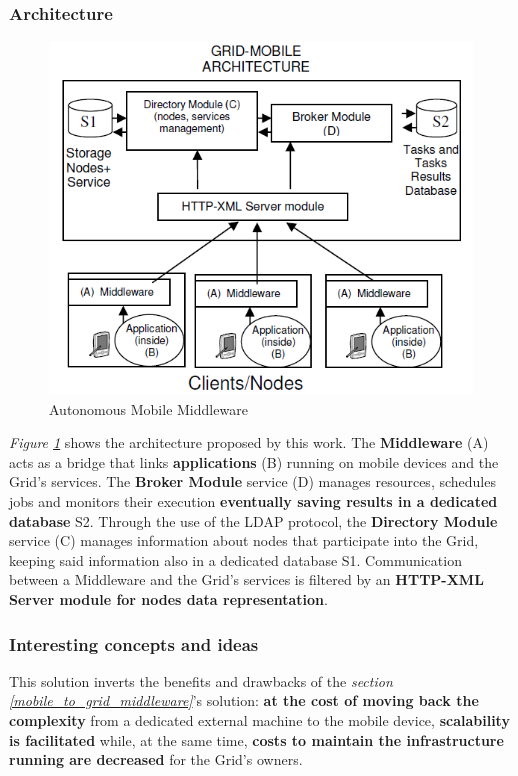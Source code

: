\subsubsection{Architecture}
\begin{figure}[!ht]
    \centering
    \includegraphics[scale=0.9]{document/chapters/chapter_3/images/2006_architecture.png}
    \caption{Autonomous Mobile Middleware \cite{towards_a_middleware_for_mobile_grids}}
    \label{fig:2006_architecture}
\end{figure}

\textit{Figure \ref{fig:2006_architecture}} shows the architecture proposed by this work. The \textbf{Middleware} (A) acts as a bridge that links \textbf{applications} (B) running on mobile devices and the Grid's services. The \textbf{Broker Module} service (D) manages resources, schedules jobs and monitors their execution \textbf{eventually saving results in a dedicated database} S2. Through the use of the LDAP protocol, the \textbf{Directory Module} service (C) manages information about nodes that participate into the Grid, keeping said information also in a dedicated database S1.
Communication between a Middleware and the Grid's services is filtered by an \textbf{HTTP-XML Server module for nodes data representation}.

\subsubsection{Interesting concepts and ideas}
This solution inverts the benefits and drawbacks of the \textit{section \ref{mobile_to_grid_middleware}}'s solution: \textbf{at the cost of moving back the complexity} from a dedicated external machine to the mobile device, \textbf{scalability is facilitated} while, at the same time, \textbf{costs to maintain the infrastructure running are decreased} for the Grid's owners.

